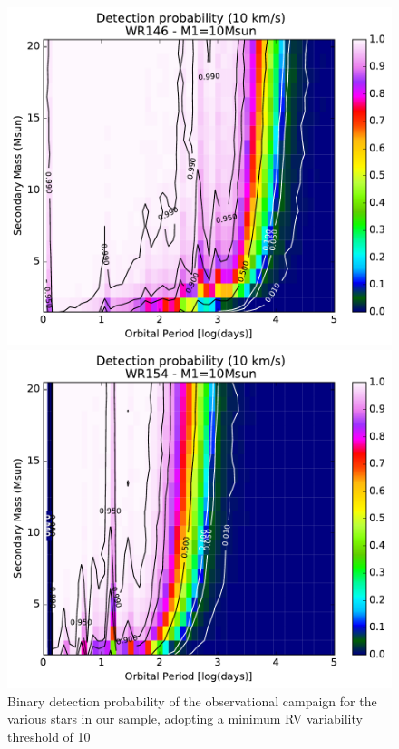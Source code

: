 \begin{figure}[h!]
\begin{minipage}{0.49\textwidth}
    \end{minipage}
    \begin{minipage}{0.49\textwidth}
    \centering
    \includegraphics[width=\textwidth]{chapters/appendix3/image/146PM2_thres10_MAR31.pdf}
    \end{minipage}
    \begin{minipage}{0.49\textwidth}
    \centering
    \includegraphics[width=\textwidth]{chapters/appendix3/image/154PM2_thres10_MAR31.pdf}
    \end{minipage}
    \caption{Binary detection probability of the observational campaign for the various stars in our sample, adopting a minimum RV variability threshold of 10~\kms}
    \label{f:Pdetect2}
\end{figure}
